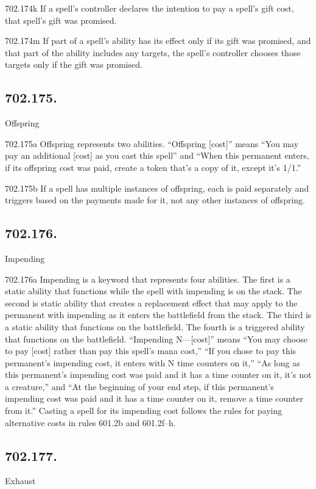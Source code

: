 702.174k If a spell’s controller declares the intention to pay a spell’s gift cost, that spell’s gift was promised.

702.174m If part of a spell’s ability has its effect only if its gift was promised, and that part of the ability includes any targets, the spell’s controller chooses those targets only if the gift was promised.

\subsection*{702.175.}
Offspring

702.175a Offspring represents two abilities. “Offspring [cost]” means “You may pay an additional [cost] as you cast this spell” and “When this permanent enters, if its offspring cost was paid, create a token that’s a copy of it, except it’s 1/1.”

702.175b If a spell has multiple instances of offspring, each is paid separately and triggers based on the payments made for it, not any other instances of offspring.

\subsection*{702.176.}
Impending

702.176a Impending is a keyword that represents four abilities. The first is a static ability that functions while the spell with impending is on the stack. The second is static ability that creates a replacement effect that may apply to the permanent with impending as it enters the battlefield from the stack. The third is a static ability that functions on the battlefield. The fourth is a triggered ability that functions on the battlefield. “Impending N—[cost]” means “You may choose to pay [cost] rather than pay this spell’s mana cost,” “If you chose to pay this permanent’s impending cost, it enters with N time counters on it,” “As long as this permanent’s impending cost was paid and it has a time counter on it, it’s not a creature,” and “At the beginning of your end step, if this permanent’s impending cost was paid and it has a time counter on it, remove a time counter from it.” Casting a spell for its impending cost follows the rules for paying alternative costs in rules 601.2b and 601.2f–h.

\subsection*{702.177.}
Exhaust

